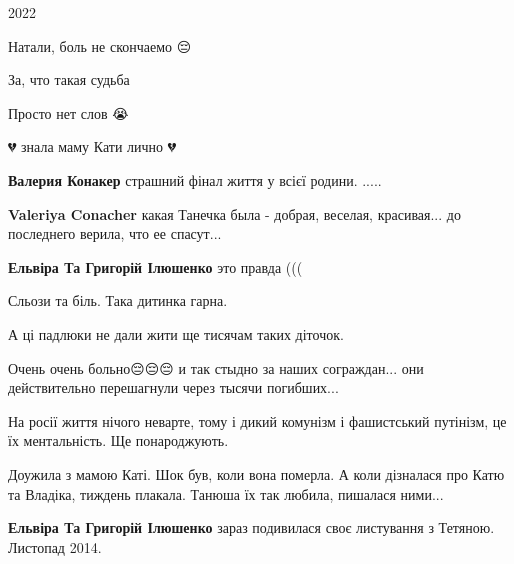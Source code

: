  
 
 
 
 

\qqSecCmt

\begin{itemize} %

2022


Натали, боль не скончаемо 😔

За, что такая судьба

Просто нет слов 😭

💔 знала маму Кати лично 💔

\begin{itemize} %
\textbf{Валерия Конакер} страшний фінал життя у всієї родини. .....

\textbf{Valeriya Conacher} какая Танечка была - добрая, веселая, красивая... до последнего верила, что ее спасут...

\textbf{Ельвіра Та Григорій Ілюшенко} это правда (((

\end{itemize} %


Сльози та біль. Така дитинка гарна.

А ці падлюки не дали жити ще тисячам таких діточок.


Очень очень больно😔😔😔 и так стыдно за наших сограждан... они действительно
перешагнули через тысячи погибших...


На росії життя нічого неварте, тому і дикий комунізм і фашистський путінізм, це
їх ментальність. Ще понароджують.


Доужила з мамою Каті. Шок був, коли вона померла. А коли дізналася про Катю та
Владіка, тиждень плакала. Танюша їх так любила, пишалася ними...

\begin{itemize} %
\textbf{Ельвіра Та Григорій Ілюшенко} зараз подивилася своє листування з Тетяною. Листопад 2014.
\end{itemize} %



\end{itemize}
